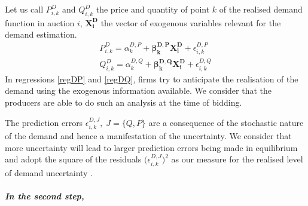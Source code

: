 Let us call $P_{i,k}^D$ and $Q_{i,k}^D$ the price and quantity of point $k$ of the realised demand function in auction $i$, $\boldsymbol{X^D_i}$ the vector of exogenous variables relevant for the demand estimation.
\begin{eqnarray}
P_{i,k}^D=\alpha_{k}^{D,P}+{\boldsymbol{\beta_{k}^{D,P}}} \boldsymbol{X^D_i}+\epsilon_{i,k}^{D,P} \label{regDP}\\
Q_{i,k}^D=\alpha_{k}^{D,Q}+{\boldsymbol{\beta_{k}^{D,Q}}} \boldsymbol{X^D_i}+\epsilon_{i,k}^{D,Q} \label{regDQ}
\end{eqnarray}
In regressions \ref{regDP} and \ref{regDQ}, firms try to anticipate the realisation of the demand using the exogenous information available. We consider that the producers are able to do such an analysis at the time of bidding. %

The prediction errors  $\epsilon_{i,k}^{D,J}, \; J=\{Q, P\}$ are a consequence of the stochastic nature of the demand and hence a manifestation of the uncertainty. We consider that more uncertainty will lead to larger prediction errors being made in equilibrium and adopt the 
square
of the residuals $ \bigl( \epsilon_{i,k}^{D,J} \bigr)^2$ as our measure for the realised level of demand uncertainty%
.



\subparagraph{In the second step,} 
\label{secondstepresiduals}

